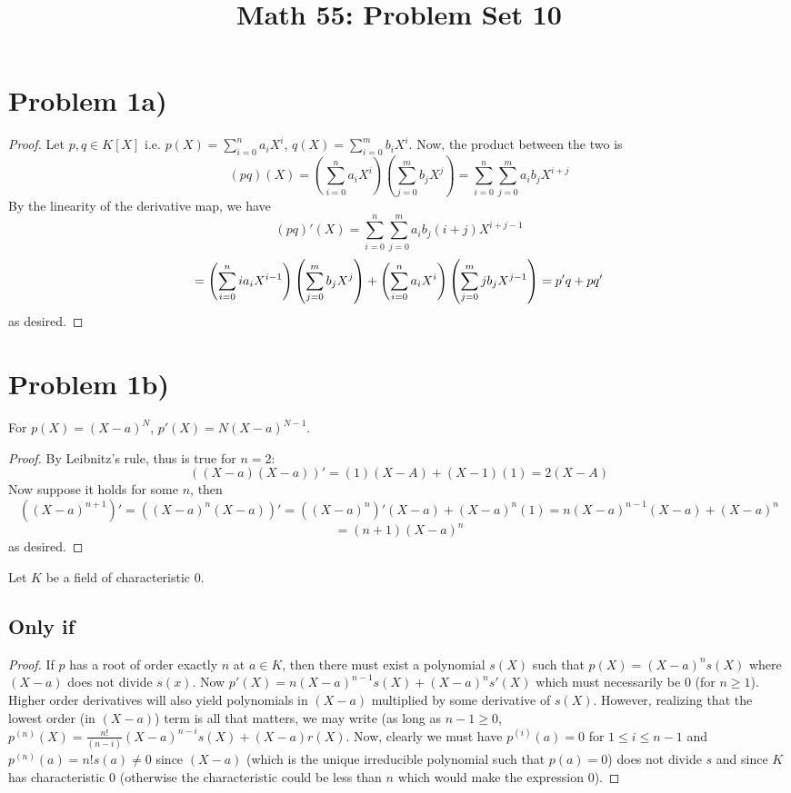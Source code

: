 \title{Math 55: Problem Set 10}

\maketitle
\section*{Problem 1a)}
\begin{proof}
Let $p, q \in K[X]$ i.e. $p(X) = \sum_{i=0}^n a_i X^i$, $q(X) = \sum_{i=0}^m b_i X^i$. Now, the product between the two is
\[ (pq)(X) = (\sum_{i=0}^n a_i X^i)(\sum_{j=0}^m b_j X^j) = \sum_{i=0}^n \sum_{j=0}^m a_i b_j  X^{i+j} \]
By the linearity of the derivative map, we have
\[  (pq)'(X) = \sum_{i=0}^n \sum_{j=0}^m a_i b_j (i+j)  X^{i+j-1} 
\]\[ = \left(\sum_{i=0}^n i a_i X^{i-1}  \right)\left( \sum_{j=0}^m b_j X^j  \right) + \left( \sum_{i=0}^n a_i X^i  \right)\left( \sum_{j=0}^m jb_j X^{j-1}  \right)  = p'q + pq'
\]
as desired. 
\end{proof}
\section*{Problem 1b)}
\begin{lemma}
For $p(X)=(X-a)^N$, $p'(X)=N(X-a)^{N-1}$. 
\begin{proof} By Leibnitz's rule, thus is true for $n=2$:
\[ ((X-a)(X-a))' = (1)(X-A)+(X-1)(1)=2(X-A) \]
Now suppose it holds for some $n$, then 
\[ ((X-a)^{n+1})' = ((X-a)^n(X-a))' = ((X-a)^n)'(X-a) + (X-a)^n(1) =  n (X-a)^{n-1}(X-a) + (X-a)^n \]\[ = (n+1)(X-a)^n  \]
as desired.
\end{proof}
\end{lemma}
Let $K$ be a field of characteristic $0$.
\subsection*{Only if}
\begin{proof}
If $p$ has a root of order exactly $n$ at $a\in K$, then there must exist a polynomial $s(X)$ such that $p(X)=(X-a)^ns(X)$ where $(X-a)$ does not divide $s(x)$. Now $p'(X) = n (X-a)^{n-1} s(X) +  (X-a)^{n} s'(X)$ which must necessarily be $0$ (for $n\geq 1$). Higher order derivatives  will also yield polynomials in  $(X-a)$ multiplied by some derivative of $s(X)$. However, realizing that the lowest order (in $(X-a)$) term is all that matters, we may write (as long as $n-1\geq 0$, $p^{(n)}(X) = \frac{n!}{(n-i)} (X-a)^{n-i} s(X) + (X-a) r(X)$. Now, clearly we must have $p^(i)(a)=0$ for $1\leq i \leq n-1$ and $p^{(n)}(a) = n! s(a)\neq 0$ since $(X-a)$ (which is the unique irreducible polynomial such that $p(a) = 0$) does not divide $s$ and since $K$ has characteristic $0$ (otherwise the characteristic could be less than $n$ which would make the expression $0$).
\end{proof}
